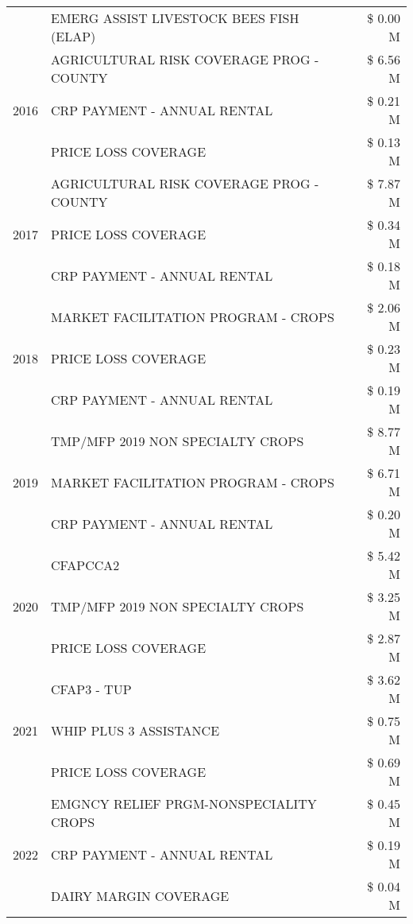 \begin{tabular}{llr}
 & EMERG ASSIST LIVESTOCK BEES FISH (ELAP) & \$ 0.00 M \\
\cline{1-3}
\multirow[t]{3}{*}{2016} & AGRICULTURAL RISK COVERAGE PROG - COUNTY & \$ 6.56 M \\
 & CRP PAYMENT - ANNUAL RENTAL & \$ 0.21 M \\
 & PRICE LOSS COVERAGE & \$ 0.13 M \\
\cline{1-3}
\multirow[t]{3}{*}{2017} & AGRICULTURAL RISK COVERAGE PROG - COUNTY & \$ 7.87 M \\
 & PRICE LOSS COVERAGE & \$ 0.34 M \\
 & CRP PAYMENT - ANNUAL RENTAL & \$ 0.18 M \\
\cline{1-3}
\multirow[t]{3}{*}{2018} & MARKET FACILITATION PROGRAM - CROPS & \$ 2.06 M \\
 & PRICE LOSS COVERAGE & \$ 0.23 M \\
 & CRP PAYMENT - ANNUAL RENTAL & \$ 0.19 M \\
\cline{1-3}
\multirow[t]{3}{*}{2019} & TMP/MFP 2019 NON SPECIALTY CROPS & \$ 8.77 M \\
 & MARKET FACILITATION PROGRAM - CROPS & \$ 6.71 M \\
 & CRP PAYMENT - ANNUAL RENTAL & \$ 0.20 M \\
\cline{1-3}
\multirow[t]{3}{*}{2020} & CFAPCCA2 & \$ 5.42 M \\
 & TMP/MFP 2019 NON SPECIALTY CROPS & \$ 3.25 M \\
 & PRICE LOSS COVERAGE & \$ 2.87 M \\
\cline{1-3}
\multirow[t]{3}{*}{2021} & CFAP3 - TUP & \$ 3.62 M \\
 & WHIP PLUS 3 ASSISTANCE & \$ 0.75 M \\
 & PRICE LOSS COVERAGE & \$ 0.69 M \\
\cline{1-3}
\multirow[t]{3}{*}{2022} & EMGNCY RELIEF PRGM-NONSPECIALITY CROPS & \$ 0.45 M \\
 & CRP PAYMENT - ANNUAL RENTAL & \$ 0.19 M \\
 & DAIRY MARGIN COVERAGE & \$ 0.04 M \\
\cline{1-3}
\bottomrule
\end{tabular}
